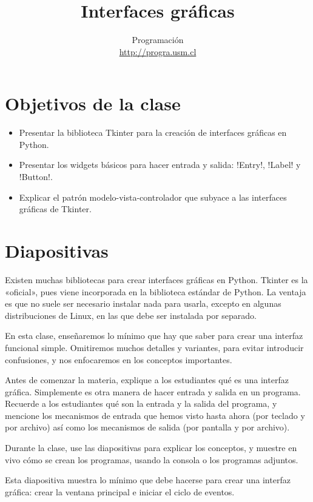 \documentclass[10pt]{article}
\title{Interfaces gráficas}
\author{Programación \\ \url{http://progra.usm.cl}}
\date{}
\begin{document}
  \maketitle

  \section*{Objetivos de la clase}
  \begin{itemize}
    \item Presentar la biblioteca Tkinter
      para la creación de interfaces gráficas en Python.
    \item Presentar los widgets básicos
      para hacer entrada y salida:
      \li!Entry!, \li!Label! y \li!Button!.
    \item Explicar el patrón modelo-vista-controlador
      que subyace a las interfaces gráficas de Tkinter.
  \end{itemize}

  \section*{Diapositivas}

  Existen muchas bibliotecas para crear interfaces gráficas en Python.
  Tkinter es la «oficial»,
  pues viene incorporada en la biblioteca estándar de Python.
  La ventaja es que no suele ser necesario instalar nada para usarla,
  excepto en algunas distribuciones de Linux, en las que debe ser instalada por separado.

  En esta clase,
  enseñaremos lo mínimo que hay que saber para crear una interfaz funcional simple.
  Omitiremos muchos detalles y variantes,
  para evitar introducir confusiones,
  y nos enfocaremos en los conceptos importantes.

  Antes de comenzar la materia,
  explique a los estudiantes qué es una interfaz gráfica.
  Simplemente es otra manera de hacer entrada y salida en un programa.
  Recuerde a los estudiantes qué son la entrada y la salida del programa,
  y mencione los mecanismos de entrada que hemos visto hasta ahora
  (por teclado y por archivo)
  así como los mecanismos de salida
  (por pantalla y por archivo).

  Durante la clase,
  use las diapositivas para explicar los conceptos,
  y muestre en vivo cómo se crean los programas,
  usando la consola o los programas adjuntos.


  Esta diapositiva muestra lo mínimo que debe hacerse
  para crear una interfaz gráfica:
  crear la ventana principal
  e iniciar el ciclo de eventos.
\end{document}
